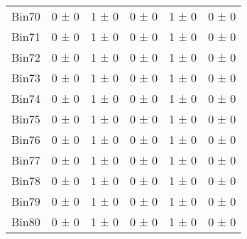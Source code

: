 \begin{tabular}{@{\extracolsep{4pt}}lccccc@{}}
     Bin70 & 0 ± 0 & 1 ± 0 & 0 ± 0 & 1 ± 0 & 0 ± 0 \\ 
     Bin71 & 0 ± 0 & 1 ± 0 & 0 ± 0 & 1 ± 0 & 0 ± 0 \\ 
     Bin72 & 0 ± 0 & 1 ± 0 & 0 ± 0 & 1 ± 0 & 0 ± 0 \\ 
     Bin73 & 0 ± 0 & 1 ± 0 & 0 ± 0 & 1 ± 0 & 0 ± 0 \\ 
     Bin74 & 0 ± 0 & 1 ± 0 & 0 ± 0 & 1 ± 0 & 0 ± 0 \\ 
     Bin75 & 0 ± 0 & 1 ± 0 & 0 ± 0 & 1 ± 0 & 0 ± 0 \\ 
     Bin76 & 0 ± 0 & 1 ± 0 & 0 ± 0 & 1 ± 0 & 0 ± 0 \\ 
     Bin77 & 0 ± 0 & 1 ± 0 & 0 ± 0 & 1 ± 0 & 0 ± 0 \\ 
     Bin78 & 0 ± 0 & 1 ± 0 & 0 ± 0 & 1 ± 0 & 0 ± 0 \\ 
     Bin79 & 0 ± 0 & 1 ± 0 & 0 ± 0 & 1 ± 0 & 0 ± 0 \\ 
     Bin80 & 0 ± 0 & 1 ± 0 & 0 ± 0 & 1 ± 0 & 0 ± 0 \\ 
\hline\hline
  \end{tabular}
